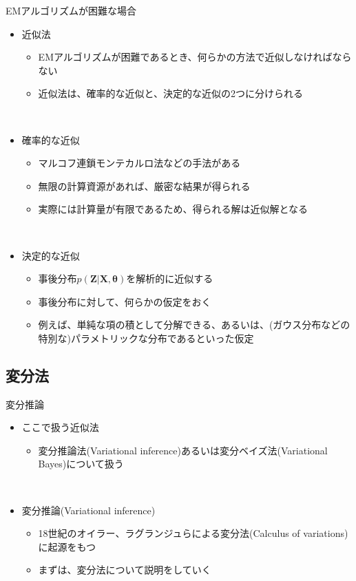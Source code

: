 \documentclass[dvipdfmx,notheorems,t]{beamer}
\begin{document}
\begin{frame}{EMアルゴリズムが困難な場合}

\begin{itemize}
	\item 近似法
	\begin{itemize}
		\item EMアルゴリズムが困難であるとき、何らかの方法で\alert{近似}しなければならない
		\item 近似法は、\alert{確率的な近似}と、\alert{決定的な近似}の2つに分けられる
	\end{itemize} \
	
	\item 確率的な近似
	\begin{itemize}
		\item \alert{マルコフ連鎖モンテカルロ法}などの手法がある
		\item \alert{無限の計算資源があれば}、厳密な結果が得られる
		\item 実際には計算量が有限であるため、得られる解は近似解となる
	\end{itemize} \
	
	\item 決定的な近似
	\begin{itemize}
		\item 事後分布$p(\bm{Z} | \bm{X}, \bm{\theta})$を\alert{解析的に近似}する
		\item 事後分布に対して、\alert{何らかの仮定をおく}
		\item 例えば、\alert{単純な項の積として分解できる}、あるいは、(ガウス分布などの特別な)\alert{パラメトリックな分布である}といった仮定
	\end{itemize}
\end{itemize}

\end{frame}

\subsection{変分法}

\begin{frame}{変分推論}

\begin{itemize}
	\item ここで扱う近似法
	\begin{itemize}
		\item \alert{変分推論法}(Variational inference)あるいは\alert{変分ベイズ法}(Variational Bayes)について扱う
	\end{itemize} \
	
	\item \alert{変分推論}(Variational inference)
	\begin{itemize}
		\item 18世紀のオイラー、ラグランジュらによる\alert{変分法}(Calculus of variations)に起源をもつ
		\newline
		\item まずは、変分法について説明をしていく
	\end{itemize}
\end{itemize}

\end{frame}
\end{document}
